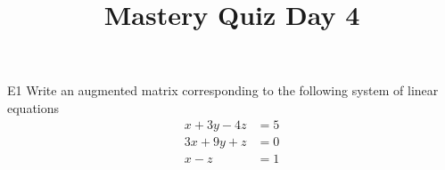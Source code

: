 \documentclass{sbgLAquiz}
\title{Mastery Quiz Day 4 }
\begin{document}
\begin{problem}{E1}
Write an augmented matrix corresponding to the following system of linear equations
\begin{align*}
x+3y-4z &= 5 \\
3x+9y+z &= 0 \\
x-z &= 1
\end{align*}
\end{problem}
\end{document}

